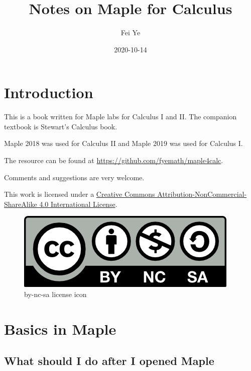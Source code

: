 \documentclass[
  en,11pt,simple]{elegantbook}
\institute{QCC-CUNY}
\title{Notes on Maple for Calculus}
\author{Fei Ye}
\date{2020-10-14}
\renewcommand{\baselinestretch}{1.2}
\renewcommand{\baselinestretch}{0.975}
\begin{document}
\maketitle

{
\setcounter{tocdepth}{0}
\tableofcontents
}
\mainmatter

\hypersetup{pageanchor=true}

\renewcommand{\baselinestretch}{1.2}\normalsize

\captionsetup[figure]{labelformat=empty}
\captionsetup[subfigure]{labelformat=empty}

\hypertarget{introduction}{%
\chapter*{Introduction}\label{introduction}}

This is a book written for Maple labs for Calculus I and II. The companion textbook is Stewart's Calculus book.

Maple 2018 was used for Calculus II and Maple 2019 was used for Calculus I.

The resource can be found at \url{https://github.com/fyemath/maple4calc}.

Comments and suggestions are very welcome.

This work is licensed under a \href{https://creativecommons.org/licenses/by-nc-sa/4.0/}{Creative Commons Attribution-NonCommercial-ShareAlike 4.0 International License}.

\begin{figure}
\centering
\includegraphics{figs/by-nc-sa.png}
\caption{by-nc-sa license icon}
\end{figure}

\hypertarget{basics-in-maple}{%
\chapter{Basics in Maple}\label{basics-in-maple}}

\hypertarget{what-should-i-do-after-i-opened-maple}{%
\section{What should I do after I opened Maple}\label{what-should-i-do-after-i-opened-maple}}
\end{document}
